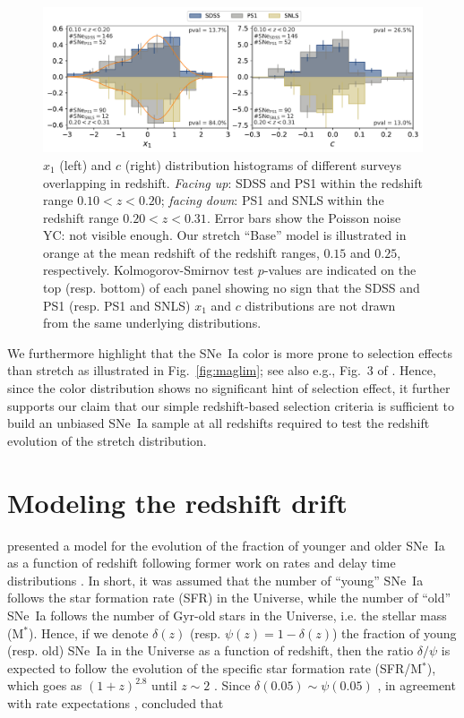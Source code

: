\documentclass[]{aa}
\newcommand{\nn}[1]{\textcolor[rgb]{0.4, 0.8, 0}{#1}}
\newcommand{\yc}[1]{\textcolor[RGB]{217, 22, 102}{#1}}
\begin{document}
\begin{figure}
    \centering
    \includegraphics[width=0.95\linewidth]{Article_figures/both-cut_SDSS_SNLS_PS1.pdf}
    \caption{$x_1$ (left) and $c$ (right) distribution histograms of different
        surveys overlapping in redshift. \textit{Facing up}: SDSS and PS1 within
        the redshift range $0.10 < z < 0.20$; \textit{facing down}: PS1 and SNLS
        within the redshift range $0.20 < z < 0.31$. Error bars show the Poisson
        noise \yc{YC: not visible enough}. Our stretch ``Base'' model is
        illustrated in orange at the mean redshift of the redshift ranges,
        $0.15$ and $0.25$, respectively.  Kolmogorov-Smirnov test $p$-values are
    indicated on the top (resp. bottom) of each panel showing no sign that the
SDSS and PS1 (resp. PS1 and SNLS) $x_1$ and $c$ distributions are not drawn from
the same underlying distributions.}
    \label{fig:distrib}
\end{figure}

We furthermore highlight that the SNe~Ia color is more prone to selection
effects than stretch as illustrated in Fig.~\ref{fig:maglim}; see also e.g.,
Fig.~3 of \cite{kessler2017}. Hence, since the color distribution shows no
significant hint of selection effect, it further supports our claim that our
simple redshift-based selection criteria is sufficient to \nn{build an unbiased
SNe~Ia sample at all redshifts required to test the redshift evolution of the
stretch distribution}.

\section{Modeling the redshift drift}\label{sec:modeling}

\cite{rigault2018} presented a model for the evolution of the fraction of
younger and older SNe~Ia as a function of redshift following former work on
rates and delay time distributions \citep[e.g.,][]{mannucci2005,
scannapieco2005, sullivan2006, aubourg2008, childress2014, maozmannucci2014}.
In short, it was assumed that the number of ``young'' SNe~Ia follows the star
formation rate (SFR) in the Universe, while the number of ``old'' SNe~Ia follows
the number of Gyr-old stars in the Universe, i.e. the stellar mass (M$^*$).
Hence, if we denote $\delta(z)$ (resp. $\psi(z) = 1-\delta(z)$) the fraction of
young (resp. old) SNe~Ia in the Universe as a function of redshift, then the
ratio $\delta/\psi$ is expected to follow the evolution of the specific star
formation rate (SFR/M$^*$), which goes as $(1+z)^{2.8}$ until $z\sim2$
\citep[e.g.,][]{tasca2015}. Since $\delta(0.05) \sim \psi(0.05)$
\citep{rigault2013, rigault2018, wiseman2020}, in agreement with rate
expectations \citep{mannucci2006, rodney2014}, \cite{rigault2018} concluded that
\end{document}
